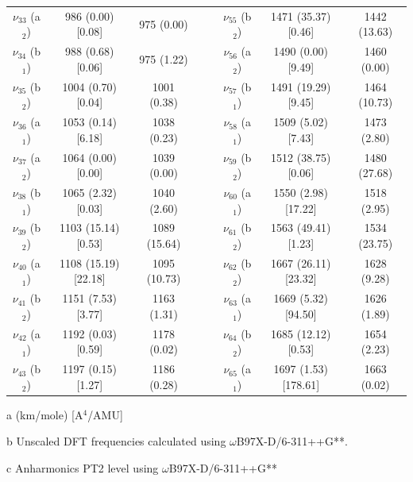 \begin{table}[H]
\begin{center}
\begin{threeparttable}
{\begin{tabular}{c c c c c c c c}
$\nu_{33}$ (a$_{2}$) & 986 (0.00) [0.08] & 975 (0.00) &  & &$\nu_{55}$ (b$_{2}$) & 1471 (35.37) [0.46] & 1442 (13.63)\\ 
$\nu_{34}$ (b$_{1}$)	& 988 (0.68) [0.06] & 975 (1.22)& & & $\nu_{56}$ (a$_{2}$) & 1490 (0.00) [9.49] & 1460 (0.00) \\ 
$\nu_{35}$ (b$_{2}$) & 1004 (0.70) [0.04] & 1001 (0.38)&  & & $\nu_{57}$ (b$_{1}$)& 1491 (19.29) [9.45] & 1464 (10.73) \\ 
$\nu_{36}$ (a$_{1}$) & 1053 (0.14) [6.18] & 1038 (0.23)&  & & $\nu_{58}$ (a$_{1}$) & 1509 (5.02) [7.43] & 1473 (2.80) \\ 
$\nu_{37}$ (a$_{2}$) & 1064 (0.00) [0.00] & 1039 (0.00) & & &$\nu_{59}$ (b$_{2}$) & 1512 (38.75) [0.06] & 1480 (27.68)\\
$\nu_{38}$ (b$_{1}$) & 1065 (2.32) [0.03] & 1040 (2.60) &  & &	$\nu_{60}$ (a$_{1}$) & 1550 (2.98) [17.22] & 1518 (2.95)\\ 
$\nu_{39}$ (b$_{2}$) & 1103 (15.14) [0.53] & 1089 (15.64)&  & &	$\nu_{61}$ (b$_{2}$) & 1563 (49.41) [1.23] & 1534 (23.75) \\ 
$\nu_{40}$ (a$_{1}$) & 1108 (15.19) [22.18] & 1095 (10.73)& &  &$\nu_{62}$ (b$_{2}$)& 1667 (26.11) [23.32] & 1628 (9.28) \\ 
$\nu_{41}$ (b$_{2}$) & 1151 (7.53) [3.77] & 1163 (1.31)&  & & $\nu_{63}$ (a$_{1}$) & 1669 (5.32) [94.50] & 1626 (1.89)\\ 
$\nu_{42}$ (a$_{1}$) & 1192 (0.03) [0.59] & 1178 (0.02)&  & & $\nu_{64}$ (b$_{2}$) & 1685 (12.12) [0.53] & 1654 (2.23)\\ 
$\nu_{43}$ (b$_{2}$) & \multicolumn{1}{c}{1197 (0.15) [1.27]} & 1186 (0.28)& & & $\nu_{65}$ (a$_{1}$) & 1697 (1.53) [178.61] & 1663 (0.02) \\
	\bottomrule
	\end{tabular}}
	
	\begin{tablenotes}
		\item[a] (km/mole) [A$^{4}$/AMU]
		\item[b] Unscaled DFT frequencies calculated using $\omega$B97X-D/6-311++G**.
		\item[c] Anharmonics PT2 level using $\omega$B97X-D/6-311++G** 
	\end{tablenotes}
\end{threeparttable}
\end{center}
\label{freq-18-dmcarbazole}
\end{table}


	
